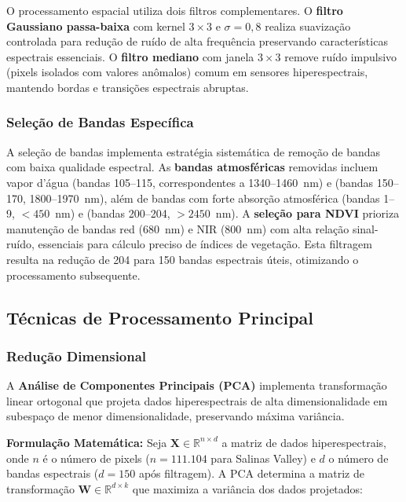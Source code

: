 O processamento espacial utiliza dois filtros complementares. O \textbf{filtro 
Gaussiano passa-baixa} com kernel $3 \times 3$ e $\sigma=0{,}8$ realiza suavização controlada 
para redução de ruído de alta frequência preservando características espectrais 
essenciais. O \textbf{filtro mediano} com janela $3 \times 3$ remove ruído impulsivo 
(pixels isolados com valores anômalos) comum em sensores hiperespectrais, 
mantendo bordas e transições espectrais abruptas.

\subsubsection{Seleção de Bandas Específica}

A seleção de bandas implementa estratégia sistemática de remoção de bandas 
com baixa qualidade espectral. As \textbf{bandas atmosféricas} removidas incluem 
vapor d'água (bandas 105--115, correspondentes a 1340--1460~nm) e (bandas 150--170, 
1800--1970~nm), além de bandas com forte absorção atmosférica (bandas 1--9, $< 450$~nm) 
e (bandas 200--204, $> 2450$~nm). A \textbf{seleção para NDVI} prioriza manutenção 
de bandas red (680~nm) e NIR (800~nm) com alta relação sinal-ruído, essenciais 
para cálculo preciso de índices de vegetação. Esta filtragem resulta na redução 
de 204 para 150 bandas espectrais úteis, otimizando o processamento subsequente.

\subsection{Técnicas de Processamento Principal}\label{subsec:tecnicas_principais}

\subsubsection{Redução Dimensional}

A \textbf{Análise de Componentes Principais (PCA)} implementa transformação 
linear ortogonal que projeta dados hiperespectrais de alta dimensionalidade 
em subespaço de menor dimensionalidade, preservando máxima variância.

\textbf{Formulação Matemática:} Seja $\mathbf{X} \in \mathbb{R}^{n \times d}$ 
a matriz de dados hiperespectrais, onde $n$ é o número de pixels ($n = 111{.}104$ 
para Salinas Valley) e $d$ o número de bandas espectrais ($d = 150$ após filtragem). 
A PCA determina a matriz de transformação $\mathbf{W} \in \mathbb{R}^{d \times k}$ 
que maximiza a variância dos dados projetados:

